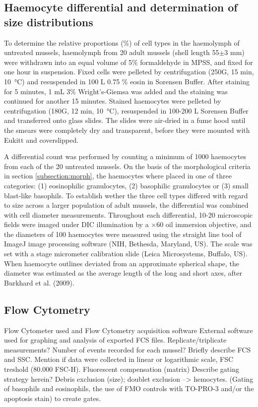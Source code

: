 \subsection{Haemocyte differential and determination of size distributions}
\label{subsection:CytCar}
To determine the relative proportions (\%) of cell types in the haemolymph of untreated mussels, haemolymph from 20 adult mussels (shell length 55$\pm{3}$ mm) were withdrawn into an equal volume of 5\% formaldehyde in MPSS, and fixed for one hour in suspension. Fixed cells were pelleted by centrifugation (250G, 15 min, \SI{10}{\celsius}) and resuspended in 100 \micro L 0.75 \% eosin in Sorensen Buffer. After staining for 5 minutes, 1 mL 3\% Wright’s-Giemsa was added and the staining was continued for another 15 minutes. Stained haemocytes were pelleted by centrifugation (180G, 12 min, \SI{10}{\celsius}), resuspended in 100-200 \micro L Sorensen Buffer and transferred onto glass slides. The slides were air-dried in a fume hood until the smears were completely dry and transparent, before they were mounted with Eukitt\textsuperscript{\textregistered} and coverslipped.

A differential count was performed by counting a minimum of 1000 haemocytes from each of the 20 untreated mussels. On the basis of the morphological criteria in section \ref{subsection:morph}, the haemocytes where placed in one of three categories: (1) eosinophilic granulocytes, (2) basophilic granulocytes or (3) small blast-like basophils. To establish wether the three cell types differed with regard to size across a larger population of adult mussels, the differential was combined with cell diameter measurements. Throughout each differential, 10-20 microscopic fields were imaged under DIC illumination by a $\times$60 oil immersion objective, and the diameters of 100 haemocytes were measured using the straight line tool of ImageJ image processing software (NIH, Bethesda, Maryland, US). The scale was set with a stage micrometer calibration slide (Leica Microsystems, Buffalo, US). When haemocyte outlines deviated from an approximate spherical shape, the diameter was estimated as the average length of the long and short axes, after Burkhard et al. (2009).

\subsection{Flow Cytometry}
Flow Cytometer used and Flow Cytometry acquisition software
External software used for graphing and analysis of exported FCS files.
Replicate/triplicate measurements?
Number of events recorded for each mussel?
Briefly describe FCS and SSC.
Mention if data were collected in linear or logarithmic scale, 
FSC treshold (80.000 FSC-H). 
Fluorescent compensation (matrix)
Describe gating strategy herein? Debris exclusion (size); doublet exclusion --> hemocytes. (Gating of basophils and eosinophils, the use of FMO controls with TO-PRO-3 and/or the apoptosis stain) to create gates.


